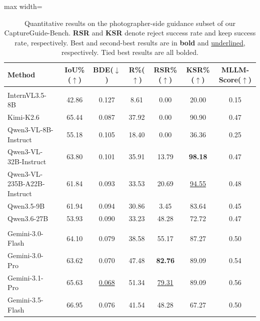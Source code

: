 \documentclass{article} %
\begin{document}
\begin{table}[h]
  \centering
  \caption{Quantitative results on the photographer-side guidance subset of our CaptureGuide-Bench. \textbf{RSR} and \textbf{KSR} denote reject success rate and keep success rate, respectively. Best and second-best results are in \textbf{bold} and \underline{underlined}, respectively. Tied best results are all bolded.}
  \label{tab:photographer_side_bench}
  \begin{adjustbox}{max width=\linewidth}
  \small
  \renewcommand{\arraystretch}{1}
  \setlength{\tabcolsep}{1.1mm}
  \begin{tabular}{l|cccccc}
    \toprule
    \textbf{Method} & IoU\%($\uparrow$) & BDE($\downarrow$) & R\%($\uparrow$) & RSR\%($\uparrow$) & KSR\%($\uparrow$) & MLLM-Score($\uparrow$) \\
    \midrule
    \rowcolor{myred}\multicolumn{7}{c}{\textbf{Open-source General MLLMs}} \\
    \midrule
    InternVL3.5-8B~\cite{wang2025internvl3} & 42.86 & 0.127 & 8.61 & 0.00 & 20.00 & 0.15 \\
    Kimi-K2.6~\cite{moonshotai2025kimik26} & 65.44 & 0.087 & 37.92 & 0.00 & 90.90 & 0.47 \\
    Qwen3-VL-8B-Instruct~\cite{bai2025qwen3} & 55.18 & 0.105 & 18.40 & 0.00 & 36.36 & 0.25 \\
    Qwen3-VL-32B-Instruct~\cite{bai2025qwen3} & 63.80 & 0.101 & 35.91 & 13.79 & \textbf{98.18} & 0.47 \\
    Qwen3-VL-235B-A22B-Instruct~\cite{bai2025qwen3} & 61.84 & 0.093 & 33.53 & 20.69 & \underline{94.55} & 0.48 \\
    Qwen3.5-9B~\cite{qwen35blog} & 61.94 & 0.094 & 30.86 & 3.45 & 83.64 & 0.45 \\
    Qwen3.6-27B~\cite{qwen36_27b} & 53.93 & 0.090 & 33.23 & 48.28 & 72.72 & 0.47 \\ 
    \midrule
    \rowcolor{mygreen}\multicolumn{7}{c}{\textbf{Proprietary General MLLMs}} \\
    \midrule
    Gemini-3.0-Flash~\cite{google2025gemini3flash} & 64.10 & 0.079 & 38.58 & 55.17 & 87.27 & 0.50 \\
    Gemini-3.0-Pro~\cite{google2025gemini3} & 63.62 & 0.070 & 47.48 & \textbf{82.76} & 89.09 & 0.54 \\
    Gemini-3.1-Pro~\cite{google2026gemini31pro} & 65.63 & \underline{0.068} & 51.34 & \underline{79.31} & 89.09 & 0.56 \\
    Gemini-3.5-Flash~\cite{google2026gemini35flash} & 66.95 & 0.076 & 41.54 & 48.28 & 67.27 & 0.50 \\

\end{tabular}
\end{adjustbox}
\end{table}
\end{document}
